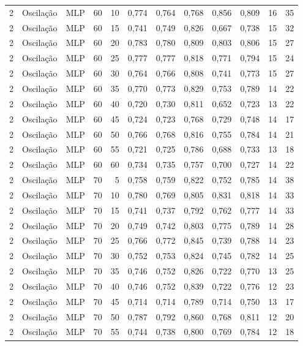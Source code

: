 \begin{longtable}{@{}rllrrrrrrrrr@{}}
2 & Oscilação & MLP & 60 & 10 & 0,774 & 0,764 & 0,768 & 0,856 & 0,809 & 16 & 35 \\
2 & Oscilação & MLP & 60 & 15 & 0,741 & 0,749 & 0,826 & 0,667 & 0,738 & 15 & 32 \\
2 & Oscilação & MLP & 60 & 20 & 0,783 & 0,780 & 0,809 & 0,803 & 0,806 & 15 & 27 \\
2 & Oscilação & MLP & 60 & 25 & 0,777 & 0,777 & 0,818 & 0,771 & 0,794 & 15 & 24 \\
2 & Oscilação & MLP & 60 & 30 & 0,764 & 0,766 & 0,808 & 0,741 & 0,773 & 15 & 27 \\
2 & Oscilação & MLP & 60 & 35 & 0,770 & 0,773 & 0,829 & 0,753 & 0,789 & 14 & 22 \\
2 & Oscilação & MLP & 60 & 40 & 0,720 & 0,730 & 0,811 & 0,652 & 0,723 & 13 & 22 \\
2 & Oscilação & MLP & 60 & 45 & 0,724 & 0,723 & 0,768 & 0,729 & 0,748 & 14 & 17 \\
2 & Oscilação & MLP & 60 & 50 & 0,766 & 0,768 & 0,816 & 0,755 & 0,784 & 14 & 21 \\
2 & Oscilação & MLP & 60 & 55 & 0,721 & 0,725 & 0,786 & 0,688 & 0,733 & 13 & 18 \\
2 & Oscilação & MLP & 60 & 60 & 0,734 & 0,735 & 0,757 & 0,700 & 0,727 & 14 & 22 \\
2 & Oscilação & MLP & 70 & 5 & 0,758 & 0,759 & 0,822 & 0,752 & 0,785 & 14 & 38 \\
2 & Oscilação & MLP & 70 & 10 & 0,780 & 0,769 & 0,805 & 0,831 & 0,818 & 14 & 33 \\
2 & Oscilação & MLP & 70 & 15 & 0,741 & 0,737 & 0,792 & 0,762 & 0,777 & 14 & 33 \\
2 & Oscilação & MLP & 70 & 20 & 0,749 & 0,742 & 0,803 & 0,775 & 0,789 & 14 & 28 \\
2 & Oscilação & MLP & 70 & 25 & 0,766 & 0,772 & 0,845 & 0,739 & 0,788 & 14 & 23 \\
2 & Oscilação & MLP & 70 & 30 & 0,752 & 0,753 & 0,824 & 0,745 & 0,782 & 14 & 25 \\
2 & Oscilação & MLP & 70 & 35 & 0,746 & 0,752 & 0,826 & 0,722 & 0,770 & 13 & 25 \\
2 & Oscilação & MLP & 70 & 40 & 0,746 & 0,752 & 0,839 & 0,722 & 0,776 & 12 & 23 \\
2 & Oscilação & MLP & 70 & 45 & 0,714 & 0,714 & 0,789 & 0,714 & 0,750 & 13 & 17 \\
2 & Oscilação & MLP & 70 & 50 & 0,787 & 0,792 & 0,860 & 0,768 & 0,811 & 12 & 20 \\
2 & Oscilação & MLP & 70 & 55 & 0,744 & 0,738 & 0,800 & 0,769 & 0,784 & 12 & 18 \\

\end{longtable}
